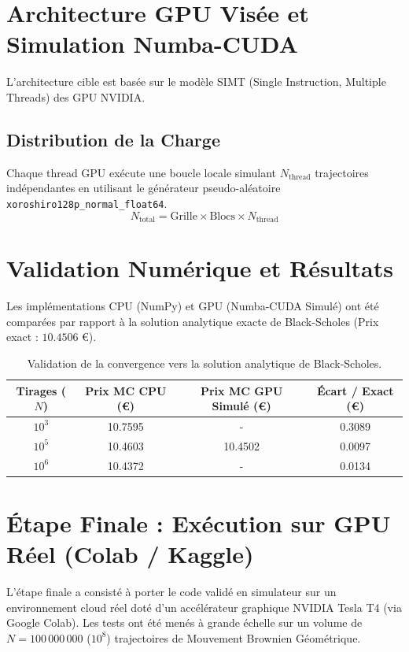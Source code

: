 \documentclass[12pt,a4paper]{article}
\begin{document}
\section{Architecture GPU Visée et Simulation Numba-CUDA}
L'architecture cible est basée sur le modèle SIMT (Single Instruction, Multiple Threads) des GPU NVIDIA. 

\subsection{Distribution de la Charge}
Chaque thread GPU exécute une boucle locale simulant \(N_{\text{thread}}\) trajectoires indépendantes en utilisant le générateur pseudo-aléatoire \texttt{xoroshiro128p\_normal\_float64}.
\begin{equation}
N_{\text{total}} = \text{Grille} \times \text{Blocs} \times N_{\text{thread}}
\end{equation}

\section{Validation Numérique et Résultats}
Les implémentations CPU (NumPy) et GPU (Numba-CUDA Simulé) ont été comparées par rapport à la solution analytique exacte de Black-Scholes (Prix exact : $10.4506$ €).

\begin{table}[h!]
\centering
\begin{tabular}{|c|c|c|c|}
\hline
\textbf{Tirages (\(N\))} & \textbf{Prix MC CPU (€)} & \textbf{Prix MC GPU Simulé (€)} & \textbf{Écart / Exact (€)} \\ \hline
\(10^3\) & 10.7595 & - & 0.3089 \\ \hline
\(10^5\) & 10.4603 & 10.4502 & 0.0097 \\ \hline
\(10^6\) & 10.4372 & - & 0.0134 \\ \hline
\end{tabular}
\caption{Validation de la convergence vers la solution analytique de Black-Scholes.}
\end{table}

\section{Étape Finale : Exécution sur GPU Réel (Colab / Kaggle)}
L'étape finale a consisté à porter le code validé en simulateur sur un environnement cloud réel doté d'un accélérateur graphique NVIDIA Tesla T4 (via Google Colab). Les tests ont été menés à grande échelle sur un volume de \(N = 100\,000\,000\) (\(10^8\)) trajectoires de Mouvement Brownien Géométrique.
\end{document}
